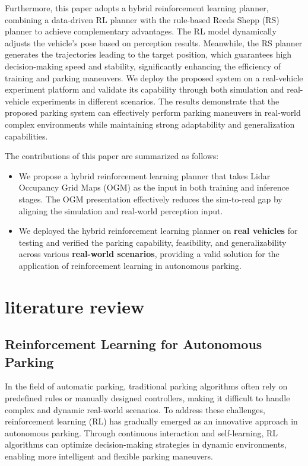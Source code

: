 \documentclass[ conference]{./support/ieeeconf}
\begin{document}
{F}{urthermore}, this paper adopts a hybrid reinforcement learning planner\cite{jiang2024hope}, combining a data-driven RL planner with the rule-based Reeds Shepp (RS)\cite{RS_curve1990} planner to achieve complementary advantages. 
The RL model dynamically adjusts the vehicle's pose based on perception results. 
Meanwhile, the RS planner generates the trajectories leading to the target position, which guarantees high decision-making speed and stability, significantly enhancing the efficiency of training and parking maneuvers.
We deploy the proposed system on a real-vehicle experiment platform and validate its capability through both simulation and real-vehicle experiments in different scenarios. 
The results demonstrate that the proposed parking system can effectively perform parking maneuvers in real-world complex environments while maintaining strong adaptability and generalization capabilities.


The contributions of this paper are summarized as follows:
\begin{itemize}
	\item We propose a hybrid reinforcement learning planner that takes Lidar
 Occupancy Grid Maps (OGM) as the input in both training and inference stages. The OGM presentation effectively reduces the sim-to-real gap by aligning the simulation and real-world perception input.
	\item We deployed the hybrid reinforcement learning planner on \textbf{real vehicles} for testing and verified the parking capability, feasibility, and generalizability across various \textbf{real-world scenarios}, providing a valid solution for the application of reinforcement learning in autonomous parking.
\end{itemize}   

\section{literature review}

\subsection{Reinforcement Learning for Autonomous  Parking}
In the field of automatic parking, traditional parking algorithms often rely on predefined rules or manually designed controllers, making it difficult to handle complex and dynamic real-world scenarios. 
To address these challenges, reinforcement learning (RL) has gradually emerged as an innovative approach in autonomous parking. 
Through continuous interaction and self-learning, RL algorithms can optimize decision-making strategies in dynamic environments, enabling more intelligent and flexible parking maneuvers.
\end{document}
